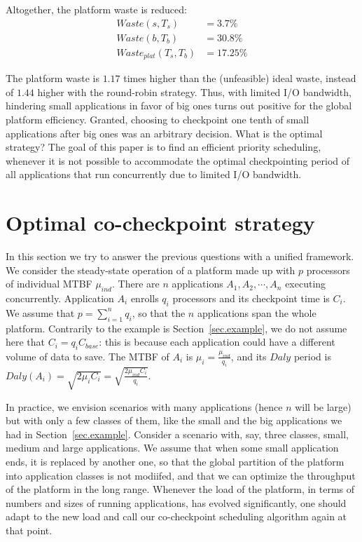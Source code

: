 \documentclass{article}
\newcommand{\ema}[1]{\ensuremath{#1}}
\newcommand{\Waste}{\ema{\mathit{Waste}}\xspace}
\newcommand{\Daly}{\ema{\mathit{Daly}}\xspace}
\begin{document}
Altogether, the platform waste is reduced:
$$
\begin{array}{rl}
\Waste(s, T_{s}) &= 3.7\%\\
\Waste(b, T_{b}) &= 30.8\%\\
\Waste_{plat}(T_{s}, T_{b}) & = 17.25\%
\end{array}
$$

The platform waste is $1.17$ times higher than the (unfeasible) ideal waste, instead of $1.44$ higher with the round-robin strategy. Thus, with limited I/O bandwidth, hindering small applications  in favor of big ones turns out positive for the global platform efficiency. 
Granted, choosing to checkpoint one tenth of small applications after big ones was an arbitrary decision. What is the optimal strategy?
The goal of this paper is to find an efficient priority scheduling, whenever it is not possible to accommodate the optimal checkpointing period of all applications that run concurrently
due to limited I/O bandwidth.


\section{Optimal co-checkpoint strategy}
\label{sec.strategy}

In this section we try to answer the previous questions with a unified framework.
We consider the steady-state operation of a platform made up with $p$ processors of individual MTBF $\mu_{ind}$. There are 
$n$ applications $A_{1}, A_{2}, \cdots, A_{n}$ executing concurrently.  Application $A_{i}$ enrolls $q_{i}$ processors and its checkpoint time is $C_{i}$. We assume that $p = \sum_{i=1}^{n} q_{i}$, so that the $n$ applications span the whole platform. Contrarily to the example is Section~\ref{sec.example},
we do not assume here that $C_{i} = q_{i} C_{\textit{base}}$: this is because each application could have a different volume of data to save. The MTBF of $A_{i}$ is $\mu_{i} = \frac{\mu_{ind}}{q_{i}}$,
and its \Daly period is $\Daly(A_{i}) = \sqrt{2 \mu_{i} C_{i}} = \sqrt{\frac{2 \mu_{ind} C_{i}}{q_{i}}}$. 

In practice, we envision scenarios with many applications (hence $n$ will be large)
but with only a few classes of them, like the small and the big applications we had
in Section~\ref{sec.example}. Consider a scenario with, say, three classes, small, medium
and large applications. We assume that when some small application ends, it is replaced by another one, so that the global partition of the platform into application classes is not 
modiifed, and that we can optimize the throughput of the platform in the long range.
Whenever the load of the platform, in terms of numbers and sizes of running applications,
has evolved significantly, one should adapt to the new load and call our co-checkpoint scheduling algorithm again at that point.
\end{document}
